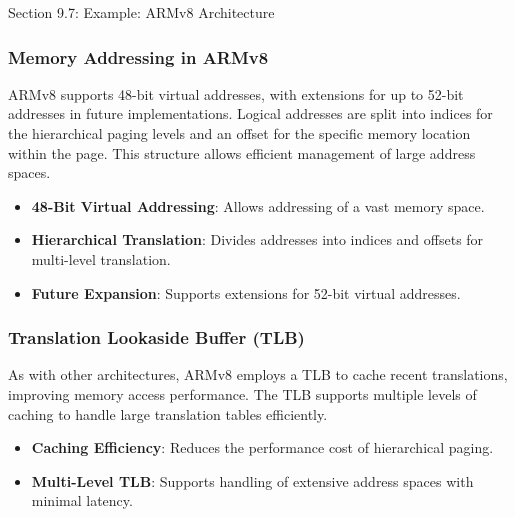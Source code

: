 \begin{notes}{Section 9.7: Example: ARMv8 Architecture}
\begin{highlight}
    \end{highlight}
    
    \subsubsection*{Memory Addressing in ARMv8}
    
    ARMv8 supports 48-bit virtual addresses, with extensions for up to 52-bit addresses in future implementations. Logical addresses are split into indices for the hierarchical paging levels and an offset 
    for the specific memory location within the page. This structure allows efficient management of large address spaces.
    
    \begin{highlight}
    
        \begin{itemize}
            \item \textbf{48-Bit Virtual Addressing}: Allows addressing of a vast memory space.
            \item \textbf{Hierarchical Translation}: Divides addresses into indices and offsets for multi-level translation.
            \item \textbf{Future Expansion}: Supports extensions for 52-bit virtual addresses.
        \end{itemize}
    
    \end{highlight}
    
    \subsubsection*{Translation Lookaside Buffer (TLB)}
    
    As with other architectures, ARMv8 employs a TLB to cache recent translations, improving memory access performance. The TLB supports multiple levels of caching to handle large translation tables efficiently.
    
    \begin{highlight}
    
        \begin{itemize}
            \item \textbf{Caching Efficiency}: Reduces the performance cost of hierarchical paging.
            \item \textbf{Multi-Level TLB}: Supports handling of extensive address spaces with minimal latency.
        \end{itemize}
    

\end{highlight}
\end{notes}
